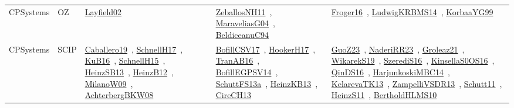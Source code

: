 {\begin{longtable}{lp{3cm}>{\raggedright\arraybackslash}p{6cm}>{\raggedright\arraybackslash}p{6cm}>{\raggedright\arraybackslash}p{8cm}}
\index{OZ}\index{CPSystems!OZ}CPSystems & OZ & \href{../works/Layfield02.pdf}{Layfield02}~\cite{Layfield02} & \href{../works/ZeballosNH11.pdf}{ZeballosNH11}~\cite{ZeballosNH11}, \href{../works/MaraveliasG04.pdf}{MaraveliasG04}~\cite{MaraveliasG04}, \href{../works/BeldiceanuC94.pdf}{BeldiceanuC94}~\cite{BeldiceanuC94} & \href{../works/Froger16.pdf}{Froger16}~\cite{Froger16}, \href{../works/LudwigKRBMS14.pdf}{LudwigKRBMS14}~\cite{LudwigKRBMS14}, \href{../works/KorbaaYG99.pdf}{KorbaaYG99}~\cite{KorbaaYG99}\\
\index{SCIP}\index{CPSystems!SCIP}CPSystems & SCIP & \href{../works/Caballero19.pdf}{Caballero19}~\cite{Caballero19}, \href{../works/SchnellH17.pdf}{SchnellH17}~\cite{SchnellH17}, \href{../works/KuB16.pdf}{KuB16}~\cite{KuB16}, \href{../works/SchnellH15.pdf}{SchnellH15}~\cite{SchnellH15}, \href{../works/HeinzSB13.pdf}{HeinzSB13}~\cite{HeinzSB13}, \href{../works/HeinzB12.pdf}{HeinzB12}~\cite{HeinzB12}, \href{../works/MilanoW09.pdf}{MilanoW09}~\cite{MilanoW09}, \href{../works/AchterbergBKW08.pdf}{AchterbergBKW08}~\cite{AchterbergBKW08} & \href{../works/BofillCSV17.pdf}{BofillCSV17}~\cite{BofillCSV17}, \href{../works/HookerH17.pdf}{HookerH17}~\cite{HookerH17}, \href{../works/TranAB16.pdf}{TranAB16}~\cite{TranAB16}, \href{../works/BofillEGPSV14.pdf}{BofillEGPSV14}~\cite{BofillEGPSV14}, \href{../works/SchuttFS13a.pdf}{SchuttFS13a}~\cite{SchuttFS13a}, \href{../works/HeinzKB13.pdf}{HeinzKB13}~\cite{HeinzKB13}, \href{../works/CireCH13.pdf}{CireCH13}~\cite{CireCH13} & \href{../works/GuoZ23.pdf}{GuoZ23}~\cite{GuoZ23}, \href{../works/NaderiRR23.pdf}{NaderiRR23}~\cite{NaderiRR23}, \href{../works/Groleaz21.pdf}{Groleaz21}~\cite{Groleaz21}, \href{../works/WikarekS19.pdf}{WikarekS19}~\cite{WikarekS19}, \href{../works/SzerediS16.pdf}{SzerediS16}~\cite{SzerediS16}, \href{../works/KinsellaS0OS16.pdf}{KinsellaS0OS16}~\cite{KinsellaS0OS16}, \href{../works/QinDS16.pdf}{QinDS16}~\cite{QinDS16}, \href{../works/HarjunkoskiMBC14.pdf}{HarjunkoskiMBC14}~\cite{HarjunkoskiMBC14}, \href{../works/KelarevaTK13.pdf}{KelarevaTK13}~\cite{KelarevaTK13}, \href{../works/ZampelliVSDR13.pdf}{ZampelliVSDR13}~\cite{ZampelliVSDR13}, \href{../works/Schutt11.pdf}{Schutt11}~\cite{Schutt11}, \href{../works/HeinzS11.pdf}{HeinzS11}~\cite{HeinzS11}, \href{../works/BertholdHLMS10.pdf}{BertholdHLMS10}~\cite{BertholdHLMS10}\\

\end{longtable}}
